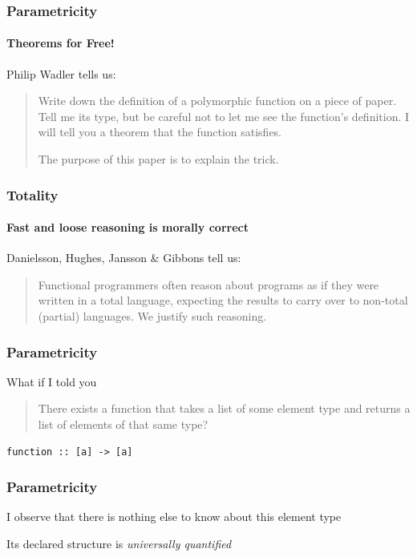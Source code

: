 \begin{frame}
\frametitle{Parametricity}
\framesubtitle{Theorems for Free!}
\begin{block}{Philip Wadler \cite{wadler1989theorems} tells us:}
\begin{quotation}
Write down the definition of a polymorphic function on a piece of paper. Tell me its type, but be careful not to let me see the function's definition. I will tell you a theorem that the function satisfies.

The purpose of this paper is to explain the trick.
\end{quotation}
\end{block}
\end{frame}


\begin{frame}
\frametitle{Totality}
\framesubtitle{Fast and loose reasoning is morally correct}
\begin{block}{Danielsson, Hughes, Jansson \& Gibbons \cite{danielsson2006fast} tell us:}
\begin{quotation}
Functional programmers often reason about programs as if
they were written in a total language, expecting the results
to carry over to non-total (partial) languages. We justify
such reasoning.
\end{quotation}
\end{block}
\end{frame}


\begin{frame}[fragile]
\frametitle{Parametricity}
\begin{block}{What if I told you}
\begin{quotation}
There exists a function that takes a list of some element type and returns a list of elements of that same type? 
\end{quotation}
\begin{lstlisting}[style=haskell]
function :: [a] -> [a]
\end{lstlisting}
\end{block}
\end{frame}


\begin{frame}[fragile]
\frametitle{Parametricity}
\begin{block}{I observe that}
there is nothing else to know about this element type
\end{block}
Its declared structure is \emph{universally quantified}
\end{frame}


